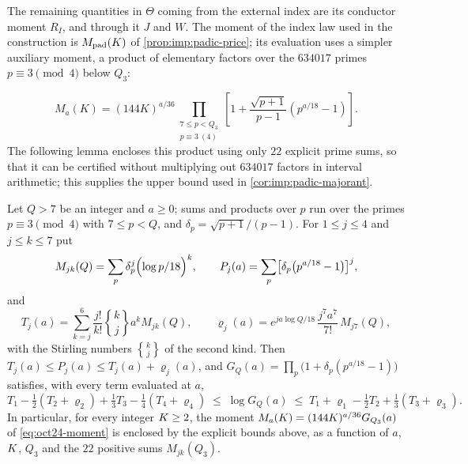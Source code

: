 The remaining quantities in $\Theta$ coming from the external
index are its conductor moment $R_I$, and through it $J$ and $W$.
The moment of the index law used in the construction is
$M_{\rm pad}(K)$ of \cref{prop:imp:padic-price}; its evaluation
uses a simpler auxiliary moment, a product of elementary factors
over the $634017$ primes $p\equiv3\pmod4$ below $Q_3$:

\begin{equation}\label{eq:oct24-moment}
 M_a(K)=(144K)^{a/36}
 \prod_{\substack{7\le p<Q_3\\p\equiv3\ (4)}}
 \left[1+\frac{\sqrt{p+1}}{p-1}(p^{a/18}-1)\right].
\end{equation}
The following lemma encloses this product using only $22$
explicit prime sums, so that it can be certified without
multiplying out $634017$ factors in interval arithmetic; this
supplies the upper bound used in \cref{cor:imp:padic-majorant}.

\begin{lemma}\label{lem:index-moments}
Let $Q>7$ be an integer and $a\ge0$; sums and products over $p$ run over the
primes $p\equiv3\pmod4$ with $7\le p<Q$, and $\delta_p=\sqrt{p+1}/(p-1)$.
For $1\le j\le4$ and $j\le k\le7$ put
\[
 M_{jk}(Q)=\sum_p\delta_p^j\Bigl(\frac{\log p}{18}\Bigr)^k,\qquad
 P_j(a)=\sum_p\bigl[\delta_p\bigl(p^{a/18}-1\bigr)\bigr]^j,
\]
and
\[
 T_j(a)=\sum_{k=j}^6\frac{j!}{k!}\genfrac{\{}{\}}{0pt}{}{k}{j}a^kM_{jk}(Q),
 \qquad
 \varrho_j(a)=e^{ja\log Q/18}\,\frac{j^7a^7}{7!}\,M_{j7}(Q),
\]
with the Stirling numbers $\genfrac{\{}{\}}{0pt}{1}{k}{j}$ of the second kind.
Then $T_j(a)\le P_j(a)\le T_j(a)+\varrho_j(a)$, and
$G_Q(a)=\prod_p\bigl(1+\delta_p(p^{a/18}-1)\bigr)$ satisfies, with every term
evaluated at $a$,
\[
 T_1-\tfrac12(T_2+\varrho_2)+\tfrac13T_3-\tfrac14(T_4+\varrho_4)\;\le\;\log G_Q(a)
 \;\le\;T_1+\varrho_1-\tfrac12T_2+\tfrac13(T_3+\varrho_3).
\]
In particular, for every integer $\Kint\ge2$, the moment
$M_a(\Kint)=(144\Kint)^{a/36}G_{Q_3}(a)$ of \eqref{eq:oct24-moment} is enclosed by the explicit bounds above, as a function of $a$, $\Kint$, $Q_3$ and the $22$ positive sums
$M_{jk}(Q_3)$.
\end{lemma}

